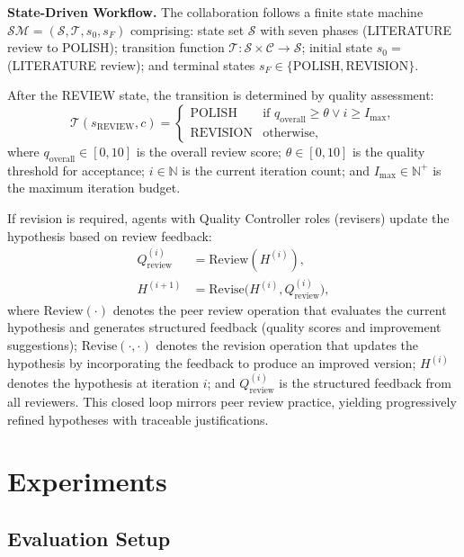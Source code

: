 \documentclass[runningheads]{llncs}
\begin{document}
\textbf{State-Driven Workflow.} The collaboration follows a finite state machine $\mathcal{SM} = (\mathcal{S}, \mathcal{T}, s_0, s_F)$ comprising: state set $\mathcal{S}$ with seven phases (LITERATURE review to POLISH); transition function $\mathcal{T}: \mathcal{S} \times \mathcal{C} \rightarrow \mathcal{S}$; initial state $s_0 = $ (LITERATURE review); and terminal states $s_F \in \{\text{POLISH}, \text{REVISION}\}$.

After the REVIEW state, the transition is determined by quality assessment:
\begin{equation}
    \mathcal{T}(s_{\text{REVIEW}}, c) =
    \begin{cases}
        \text{POLISH} & \text{if } q_{\text{overall}} \geq \theta \lor i \geq I_{\max}, \\
        \text{REVISION} & \text{otherwise},
    \end{cases}
\end{equation}
where $q_{\text{overall}} \in [0, 10]$ is the overall review score; $\theta \in [0, 10]$ is the quality threshold for acceptance; $i \in \mathbb{N}$ is the current iteration count; and $I_{\max} \in \mathbb{N}^+$ is the maximum iteration budget.

If revision is required, agents with Quality Controller roles (revisers) update the hypothesis based on review feedback:
\begin{align}
    Q_{\text{review}}^{(i)} &= \text{Review}(H^{(i)}), \\
    H^{(i+1)} &= \text{Revise}\big(H^{(i)}, Q_{\text{review}}^{(i)}\big),
\end{align}
where $\text{Review}(\cdot)$ denotes the peer review operation that evaluates the current hypothesis and generates structured feedback (quality scores and improvement suggestions); $\text{Revise}(\cdot, \cdot)$ denotes the revision operation that updates the hypothesis by incorporating the feedback to produce an improved version; $H^{(i)}$ denotes the hypothesis at iteration $i$; and $Q_{\text{review}}^{(i)}$ is the structured feedback from all reviewers. This closed loop mirrors peer review practice, yielding progressively refined hypotheses with traceable justifications.



\section{Experiments}
\subsection{Evaluation Setup}
\end{document}
